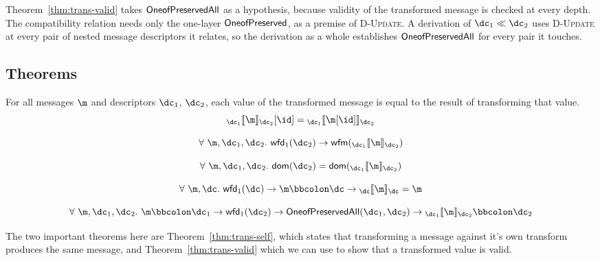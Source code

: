 Theorem~\ref{thm:trans-valid} takes $\mathsf{OneofPreservedAll}$ as a hypothesis, because
validity of the transformed message is checked at every depth. The compatibility
relation needs only the one-layer $\mathsf{OneofPreserved}$, as a premise of
\textsc{D-Update}. A derivation of $\dc_1 \dcompat \dc_2$ uses \textsc{D-Update}
at every pair of nested message descriptors it relates, so the derivation as a
whole establishes $\mathsf{OneofPreservedAll}$ for every pair it touches.

\subsection{Theorems}

\vspace{1em}
\begin{theorem}
  For all messages $\m$ and descriptors $\dc_1$, $\dc_2$, each value of the
  transformed message is equal to the result of transforming that value.
  \[ \coercion{\dc_1}{\m}{\dc_2}[\id] = \coercion{\dc_1}{\m[\id]}{\dc_2} \]
\end{theorem}

\vspace{1em}
\begin{theorem}[Transform WF]\label{thm:trans-wf}
  \[ \forall\ \m, \dc_1, \dc_2.\ \wfd{\dc_2} \rightarrow \wfm{\coercion{\dc_1}{\m}{\dc_2}} \]
\end{theorem}

\vspace{1em}
\begin{theorem}\label{thm:trans-total}
  \[ \forall\ \m, \dc_1, \dc_2.\ \dom{\dc_2} = \dom{\coercion{\dc_1}{\m}{\dc_2}} \]
\end{theorem}

\vspace{1em}
\begin{theorem}\label{thm:trans-self}
  \[ \forall\ \m, \dc.\ \wfd{\dc} \rightarrow \validv{\m}{\dc} \rightarrow \coercion{\dc}{\m}{\dc} = \m \]
\end{theorem}

\vspace{1em}
\begin{theorem}\label{thm:trans-valid}
  \[ \forall\ \m, \dc_1, \dc_2.\ \validv{\m}{\dc_1} \rightarrow \wfd{\dc_2} \rightarrow \oneofpresall(\dc_1, \dc_2) \rightarrow \validv{\coercion{\dc_1}{\m}{\dc_2}}{\dc_2} \]
\end{theorem}

The two important theorems here are Theorem~\ref{thm:trans-self}, which states
that transforming a message against it's own transform produces the same
message, and Theorem~\ref{thm:trans-valid} which we can use to show that a
transformed value is valid.

